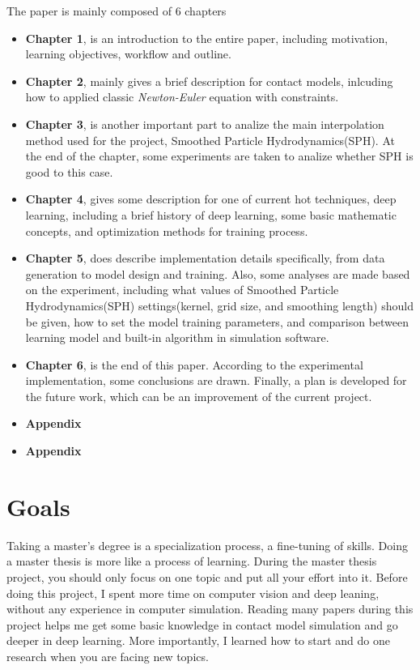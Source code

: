         The paper is mainly composed of 6 chapters
    \begin{itemize}
        \item \textbf{Chapter 1}, is an introduction to the entire paper, including motivation, learning objectives, workflow and outline.

        \item \textbf{Chapter 2}, mainly gives a brief description for contact models, inlcuding how to applied classic \textit{Newton-Euler} equation with constraints.

        \item \textbf{Chapter 3}, is another important part to analize the main interpolation method used for the project, Smoothed Particle Hydrodynamics(SPH). At the end of the chapter, some experiments are taken to analize whether SPH is good to this case.

        \item \textbf{Chapter 4}, gives some description for one of current hot techniques, deep learning, including a brief history of deep learning, some basic mathematic concepts, and optimization methods for training process.

        \item \textbf{Chapter 5}, does describe implementation details specifically, from data generation to model design and training. Also, some analyses are made based on the experiment, including what values of Smoothed Particle Hydrodynamics(SPH) settings(kernel, grid size, and smoothing length) should be given, how to set the model training parameters, and comparison between learning model and built-in algorithm in simulation software.

        \item \textbf{Chapter 6}, is the end of this paper. According to the experimental implementation, some conclusions are drawn. Finally, a plan is developed for the future work, which can be an improvement of the current project.

        \item \textbf{Appendix}

        \item \textbf{Appendix}
    \end{itemize}


\section{Goals}
    Taking a master’s degree is a specialization process, a fine-tuning of skills. Doing a master thesis is more like a process of learning. During the master thesis project, you should only focus on one topic and put all your effort into it. Before doing this project, I spent more time on computer vision and deep leaning, without any experience in computer simulation. Reading many papers during this project helps me get some basic knowledge in contact model simulation and go deeper in deep learning. More importantly, I learned how to start and do one research when you are facing new topics.\\ 

